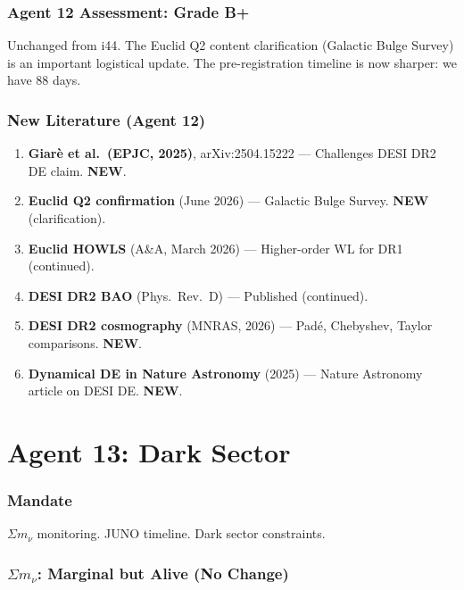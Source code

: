 \documentclass[11pt,a4paper]{article}
\newcommand{\NEW}{\textcolor{dfdblue}{\textbf{NEW}}}
\begin{document}
\section{Agent 12 Assessment: Grade B+}

Unchanged from i44. The Euclid Q2 content clarification (Galactic Bulge Survey) is an important logistical update. The pre-registration timeline is now sharper: we have 88 days.

\section{New Literature (Agent 12)}

\begin{enumerate}
\item \textbf{Giar\`e et al.\ (EPJC, 2025)}, arXiv:2504.15222 --- Challenges DESI DR2 DE claim. \NEW.
\item \textbf{Euclid Q2 confirmation} (June 2026) --- Galactic Bulge Survey. \NEW{} (clarification).
\item \textbf{Euclid HOWLS} (A\&A, March 2026) --- Higher-order WL for DR1 (continued).
\item \textbf{DESI DR2 BAO} (Phys.\ Rev.\ D) --- Published (continued).
\item \textbf{DESI DR2 cosmography} (MNRAS, 2026) --- Pad\'e, Chebyshev, Taylor comparisons. \NEW.
\item \textbf{Dynamical DE in Nature Astronomy} (2025) --- Nature Astronomy article on DESI DE. \NEW.
\end{enumerate}


\part{Agent 13: Dark Sector}
\label{part:agent13}

\section{Mandate}

$\Sigma m_\nu$ monitoring. JUNO timeline. Dark sector constraints.

\section{$\Sigma m_\nu$: Marginal but Alive (No Change)}
\end{document}
